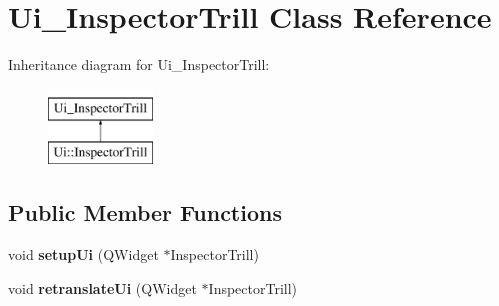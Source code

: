\hypertarget{class_ui___inspector_trill}{}\section{Ui\+\_\+\+Inspector\+Trill Class Reference}
\label{class_ui___inspector_trill}
Inheritance diagram for Ui\+\_\+\+Inspector\+Trill\+:\begin{figure}[H]
\begin{center}
\leavevmode
\includegraphics[height=2.000000cm]{class_ui___inspector_trill}
\end{center}
\end{figure}
\subsection*{Public Member Functions}
\begin{DoxyCompactItemize}
\item 
\mbox{\label{class_ui___inspector_trill_a0274d7e3c37356fec8ee5e035f1e095e}} 
void {\bfseries setup\+Ui} (Q\+Widget $\ast$Inspector\+Trill)
\item 
\mbox{\label{class_ui___inspector_trill_af28fb6e466231e46cf9fe4c168dff86d}} 
void {\bfseries retranslate\+Ui} (Q\+Widget $\ast$Inspector\+Trill)
\end{DoxyCompactItemize}
